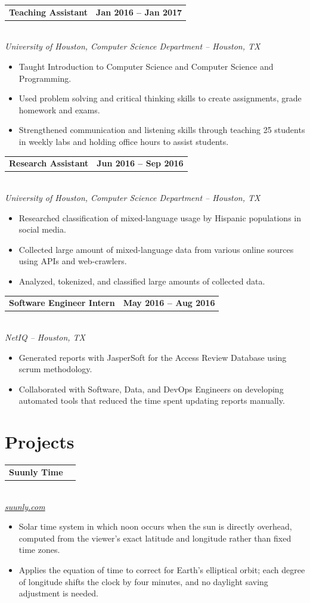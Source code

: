 \documentclass[10pt,letterpaper]{article}
\makeatletter
\newlength{\entryindent}
\newcommand{\entry}[3]{%
  \vspace{3.5pt}%
  \hspace*{\entryindent}%
  \begin{minipage}{\dimexpr\linewidth-\entryindent\relax}
    \begin{tabular*}{\linewidth}{@{}l@{\extracolsep{\fill}}r@{}}
      \textbf{#1} & \textbf{#3}
    \end{tabular*}\\
    \textit{#2}
  \end{minipage}%
  \par
}
\newenvironment{bullets}
  {\begin{itemize}[leftmargin=0.6in,labelsep=0.09in,label=\textbullet,
                   topsep=1pt,itemsep=0pt,parsep=0pt]}
  {\end{itemize}}
\makeatother
\begin{document}
\entry{Teaching Assistant}
      {University of Houston, Computer Science Department -- Houston, TX}
      {Jan 2016 -- Jan 2017}
\begin{bullets}
  \item Taught Introduction to Computer Science and Computer Science and Programming.
  \item Used problem solving and critical thinking skills to create assignments, grade homework and exams.
  \item Strengthened communication and listening skills through teaching 25 students in weekly labs and holding office hours to assist students.
\end{bullets}

\entry{Research Assistant}
      {University of Houston, Computer Science Department -- Houston, TX}
      {Jun 2016 -- Sep 2016}
\begin{bullets}
  \item Researched classification of mixed-language usage by Hispanic populations in social media.
  \item Collected large amount of mixed-language data from various online sources using APIs and web-crawlers.
  \item Analyzed, tokenized, and classified large amounts of collected data.
\end{bullets}

\entry{Software Engineer Intern}
      {NetIQ -- Houston, TX}
      {May 2016 -- Aug 2016}
\begin{bullets}
  \item Generated reports with JasperSoft for the Access Review Database using scrum methodology.
  \item Collaborated with Software, Data, and DevOps Engineers on developing automated tools that reduced the time spent updating reports manually.
\end{bullets}

\section*{Projects}

\entry{Suunly\texttrademark{} Time}
      {\href{https://suunly.com}{suunly.com}}
      {}
\begin{bullets}
  \item Solar time system in which noon occurs when the sun is directly overhead, computed from the viewer's exact latitude and longitude rather than fixed time zones.
  \item Applies the equation of time to correct for Earth's elliptical orbit; each degree of longitude shifts the clock by four minutes, and no daylight saving adjustment is needed.
\end{bullets}
\end{document}
